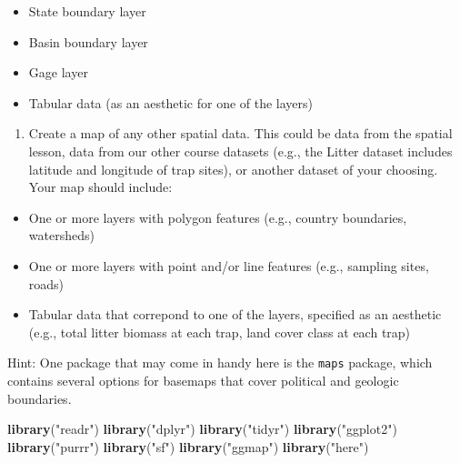 \documentclass[]{article}
\newenvironment{Shaded}{\begin{snugshade}}{\end{snugshade}}
\newcommand{\KeywordTok}[1]{\textcolor[rgb]{0.13,0.29,0.53}{\textbf{#1}}}
\newcommand{\StringTok}[1]{\textcolor[rgb]{0.31,0.60,0.02}{#1}}
\newcommand{\NormalTok}[1]{#1}
\providecommand{\tightlist}{%
  \setlength{\itemsep}{0pt}\setlength{\parskip}{0pt}}
\begin{document}
\begin{itemize}
\tightlist
\item
  State boundary layer
\item
  Basin boundary layer
\item
  Gage layer
\item
  Tabular data (as an aesthetic for one of the layers)
\end{itemize}

\begin{enumerate}
\def\labelenumi{\arabic{enumi}.}
\setcounter{enumi}{2}
\tightlist
\item
  Create a map of any other spatial data. This could be data from the
  spatial lesson, data from our other course datasets (e.g., the Litter
  dataset includes latitude and longitude of trap sites), or another
  dataset of your choosing. Your map should include:
\end{enumerate}

\begin{itemize}
\tightlist
\item
  One or more layers with polygon features (e.g., country boundaries,
  watersheds)
\item
  One or more layers with point and/or line features (e.g., sampling
  sites, roads)
\item
  Tabular data that correpond to one of the layers, specified as an
  aesthetic (e.g., total litter biomass at each trap, land cover class
  at each trap)
\end{itemize}

Hint: One package that may come in handy here is the \texttt{maps}
package, which contains several options for basemaps that cover
political and geologic boundaries.

\begin{Shaded}
\begin{Highlighting}[]
\KeywordTok{library}\NormalTok{(}\StringTok{"readr"}\NormalTok{)}
\KeywordTok{library}\NormalTok{(}\StringTok{"dplyr"}\NormalTok{)}
\KeywordTok{library}\NormalTok{(}\StringTok{"tidyr"}\NormalTok{)}
\KeywordTok{library}\NormalTok{(}\StringTok{"ggplot2"}\NormalTok{)}
\KeywordTok{library}\NormalTok{(}\StringTok{"purrr"}\NormalTok{)}
\KeywordTok{library}\NormalTok{(}\StringTok{"sf"}\NormalTok{)}
\KeywordTok{library}\NormalTok{(}\StringTok{"ggmap"}\NormalTok{)}
\KeywordTok{library}\NormalTok{(}\StringTok{"here"}\NormalTok{)}
\end{Highlighting}
\end{Shaded}
\end{document}
